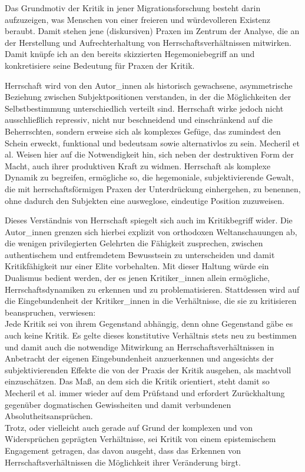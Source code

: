 Das Grundmotiv der Kritik in jener Migrationsforschung
besteht darin aufzuzeigen, was Menschen von einer freieren und würdevolleren
Existenz beraubt. Damit stehen jene (diskursiven) Praxen im Zentrum der
Analyse, die an der Herstellung und Aufrechterhaltung von
Herrschaftsverhältnissen mitwirken.\footnotemark {}
Damit knüpfe ich an den bereits
skizzierten Hegemoniebegriff an und konkretisiere seine Bedeutung für Praxen
der Kritik. 

Herrschaft wird von den Autor\_innen als historisch gewachsene,
asymmetrische Beziehung zwischen Subjektpositionen verstanden, in der die
Möglichkeiten der Selbstbestimmung unterschiedlich verteilt sind. Herrschaft
wirke jedoch nicht ausschließlich repressiv, nicht nur beschneidend und
einschränkend auf die Beherrschten, sondern erweise sich als komplexes Gefüge,
das zumindest den Schein erweckt, \glqq funktional und bedeutsam \grqq \footnotemark {} sowie
alternativlos zu sein. Mecheril et al. Weisen hier auf die Notwendigkeit hin,
sich neben der destruktiven Form der Macht, auch ihrer produktiven Kraft zu
widmen. Herrschaft als komplexe Dynamik zu begreifen, ermögliche so, die
hegemoniale, subjektivierende Gewalt, die mit herrschaftsförmigen Praxen der
Unterdrückung einhergehen, zu benennen, ohne dadurch den Subjekten eine
ausweglose, eindeutige Position zuzuweisen.\footnotemark {}

Dieses Verständnis von Herrschaft
spiegelt sich auch im Kritikbegriff wider. Die Autor\_innen grenzen sich hierbei
explizit von orthodoxen Weltanschauungen ab, die wenigen privilegierten
Gelehrten die Fähigkeit zusprechen, zwischen authentischem und entfremdetem
Bewusstsein zu unterscheiden und damit Kritikfähigkeit nur einer Elite
vorbehalten. Mit dieser Haltung würde ein Dualismus bedient werden, der es
jenen Kritiker\_innen allein ermögliche, Herrschaftsdynamiken zu erkennen und zu
problematisieren. \footnotemark {} 
Stattdessen wird auf die Eingebundenheit der Kritiker\_innen
in die Verhältnisse, die sie zu kritisieren beanspruchen, verwiesen:\\
Jede
Kritik sei von ihrem Gegenstand abhängig, denn ohne Gegenstand gäbe es auch
keine Kritik. Es gelte dieses konstitutive Verhältnis stets neu zu bestimmen
und damit auch die notwendige Mitwirkung an Herrschaftsverhältnissen in
Anbetracht der eigenen Eingebundenheit anzuerkennen und angesichts der
\glqq subjektivierenden Effekte\grqq\footnotemark {} die von der Praxis der Kritik ausgehen, als
machtvoll einzuschätzen. Das Maß, an dem sich die Kritik orientiert, steht
damit so Mecheril et al. immer wieder auf dem Prüfstand und erfordert
Zurückhaltung gegenüber dogmatischen Gewissheiten und damit verbundenen
Absolutheitsansprüchen.\footnotemark {} \\
Trotz, oder vielleicht auch gerade auf Grund der
komplexen und von Widersprüchen geprägten Verhältnisse, sei Kritik von einem
epistemischem Engagement getragen, das davon ausgeht, dass das Erkennen von
Herrschaftsverhältnissen die Möglichkeit ihrer Veränderung birgt.\footnotemark
{}
\\


